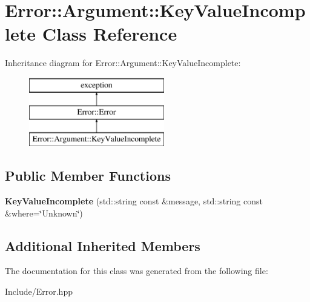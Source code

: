 \hypertarget{classError_1_1Argument_1_1KeyValueIncomplete}{}\section{Error\+:\+:Argument\+:\+:Key\+Value\+Incomplete Class Reference}
\label{classError_1_1Argument_1_1KeyValueIncomplete}
Inheritance diagram for Error\+:\+:Argument\+:\+:Key\+Value\+Incomplete\+:\begin{figure}[H]
\begin{center}
\leavevmode
\includegraphics[height=3.000000cm]{classError_1_1Argument_1_1KeyValueIncomplete}
\end{center}
\end{figure}
\subsection*{Public Member Functions}
\begin{DoxyCompactItemize}
\item 
\mbox{\label{classError_1_1Argument_1_1KeyValueIncomplete_a58e023982f3fce22da79f25fdabf1307}} 
{\bfseries Key\+Value\+Incomplete} (std\+::string const \&message, std\+::string const \&where=\char`\"{}Unknown\char`\"{})
\end{DoxyCompactItemize}
\subsection*{Additional Inherited Members}


The documentation for this class was generated from the following file\+:\begin{DoxyCompactItemize}
\item 
Include/Error.\+hpp\end{DoxyCompactItemize}
